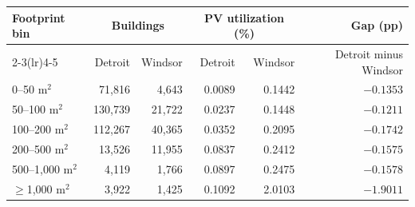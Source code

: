 \begin{tabular}{@{}lrrrrr@{}}
\toprule
Footprint bin & \multicolumn{2}{c}{Buildings} & \multicolumn{2}{c}{PV utilization (\%)} & Gap (pp) \\
\cmidrule(lr){2-3}\cmidrule(lr){4-5}
 & Detroit & Windsor & Detroit & Windsor & Detroit minus Windsor \\
\midrule
0--50 m$^{2}$ & 71,816 & 4,643 & 0.0089 & 0.1442 & $-0.1353$ \\
50--100 m$^{2}$ & 130,739 & 21,722 & 0.0237 & 0.1448 & $-0.1211$ \\
100--200 m$^{2}$ & 112,267 & 40,365 & 0.0352 & 0.2095 & $-0.1742$ \\
200--500 m$^{2}$ & 13,526 & 11,955 & 0.0837 & 0.2412 & $-0.1575$ \\
500--1,000 m$^{2}$ & 4,119 & 1,766 & 0.0897 & 0.2475 & $-0.1578$ \\
$\geq$1,000 m$^{2}$ & 3,922 & 1,425 & 0.1092 & 2.0103 & $-1.9011$ \\
\bottomrule
\end{tabular}
